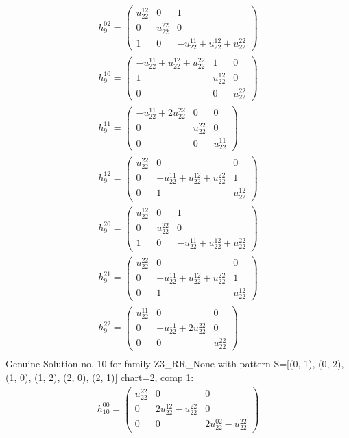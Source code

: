 \documentclass[a4paper, 11pt, twoside, onecolumn]{article}
\begin{document}
\begin{landscape}
\begin{gather*}
	 h_9^{02}=\begin{pmatrix}u^{12}_{22} & 0 & 1\\0 & u^{22}_{22} & 0\\1 & 0 & - u^{11}_{22} + u^{12}_{22} + u^{22}_{22}\end{pmatrix}\\ 
	 h_9^{10}=\begin{pmatrix}- u^{11}_{22} + u^{12}_{22} + u^{22}_{22} & 1 & 0\\1 & u^{12}_{22} & 0\\0 & 0 & u^{22}_{22}\end{pmatrix}\\ 
	 h_9^{11}=\begin{pmatrix}- u^{11}_{22} + 2 u^{22}_{22} & 0 & 0\\0 & u^{22}_{22} & 0\\0 & 0 & u^{11}_{22}\end{pmatrix}\\ 
	 h_9^{12}=\begin{pmatrix}u^{22}_{22} & 0 & 0\\0 & - u^{11}_{22} + u^{12}_{22} + u^{22}_{22} & 1\\0 & 1 & u^{12}_{22}\end{pmatrix}\\ 
	 h_9^{20}=\begin{pmatrix}u^{12}_{22} & 0 & 1\\0 & u^{22}_{22} & 0\\1 & 0 & - u^{11}_{22} + u^{12}_{22} + u^{22}_{22}\end{pmatrix}\\ 
	 h_9^{21}=\begin{pmatrix}u^{22}_{22} & 0 & 0\\0 & - u^{11}_{22} + u^{12}_{22} + u^{22}_{22} & 1\\0 & 1 & u^{12}_{22}\end{pmatrix}\\ 
	 h_9^{22}=\begin{pmatrix}u^{11}_{22} & 0 & 0\\0 & - u^{11}_{22} + 2 u^{22}_{22} & 0\\0 & 0 & u^{22}_{22}\end{pmatrix}\\ 
\end{gather*} 
Genuine Solution no. 10 for family Z3_RR_None with pattern S=[(0, 1), (0, 2), (1, 0), (1, 2), (2, 0), (2, 1)] chart=2, comp 1: 
\begin{gather*} 
	 h_10^{00}=\begin{pmatrix}u^{22}_{22} & 0 & 0\\0 & 2 u^{12}_{22} - u^{22}_{22} & 0\\0 & 0 & 2 u^{02}_{22} - u^{22}_{22}\end{pmatrix}\\ 

\end{gather*}
\end{landscape}
\end{document}
